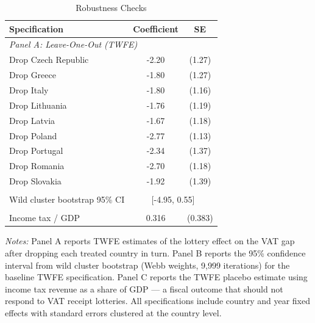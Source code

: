 \begin{table}[htbp]
\centering
\caption{Robustness Checks}
\label{tab:robust}
\begin{threeparttable}
\begin{tabular}{lcc}
\hline\hline
Specification & Coefficient & SE \\
\hline
\multicolumn{3}{l}{\textit{Panel A: Leave-One-Out (TWFE)}} \\
\addlinespace
\quad Drop Czech Republic & -2.20 & (1.27) \\
\quad Drop Greece & -1.80 & (1.27) \\
\quad Drop Italy & -1.80 & (1.16) \\
\quad Drop Lithuania & -1.76 & (1.19) \\
\quad Drop Latvia & -1.67 & (1.18) \\
\quad Drop Poland & -2.77 & (1.13) \\
\quad Drop Portugal & -2.34 & (1.37) \\
\quad Drop Romania & -2.70 & (1.18) \\
\quad Drop Slovakia & -1.92 & (1.39) \\
\addlinespace
\multicolumn{3}{l}{\textit{Panel B: Alternative Inference}} \\
\addlinespace
\quad Wild cluster bootstrap 95\% CI & \multicolumn{2}{c}{[-4.95, 0.55]} \\
\addlinespace
\multicolumn{3}{l}{\textit{Panel C: Placebo Outcome}} \\
\addlinespace
\quad Income tax / GDP & 0.316 & (0.383) \\
\hline\hline
\end{tabular}
\begin{tablenotes}[flushleft]
\small
\item \textit{Notes:} Panel A reports TWFE estimates of the lottery effect on the VAT gap after dropping each treated country in turn. Panel B reports the 95\% confidence interval from wild cluster bootstrap (Webb weights, 9,999 iterations) for the baseline TWFE specification. Panel C reports the TWFE placebo estimate using income tax revenue as a share of GDP --- a fiscal outcome that should not respond to VAT receipt lotteries. All specifications include country and year fixed effects with standard errors clustered at the country level.
\end{tablenotes}
\end{threeparttable}
\end{table}

